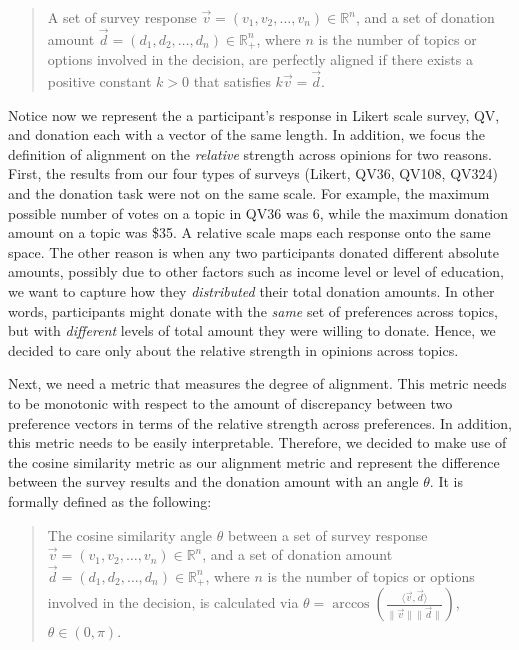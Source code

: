 \begin{quote}
    A set of survey response $\vec{v} = (v_1, v_2, \dots, v_n) \in \mathbb{R}^n$, and a set of donation amount $\vec{d} = (d_1, d_2, \dots, d_n)\in \mathbb{R}_{+}^n$, where $n$ is the number of topics or options involved in the decision, are perfectly aligned if there exists a positive constant $k>0$ that satisfies $k\vec{v} = \vec{d}$.
\end{quote}

Notice now we represent the a participant's response in Likert scale survey, QV, and donation each with a vector of the same length. In addition, we focus the definition of alignment on the \textit{relative} strength across opinions for two reasons. First, the results from our four types of surveys (Likert, QV36, QV108, QV324) and the donation task were not on the same scale. For example, the maximum possible number of votes on a topic in QV36 was 6, while the maximum donation amount on a topic was \$35. A relative scale maps each response onto the same space. The other reason is when any two participants donated different absolute amounts, possibly due to other factors such as income level or level of education, we want to capture how they \textit{distributed} their total donation amounts. In other words, participants might donate with the \textit{same} set of preferences across topics, but with \textit{different} levels of total amount they were willing to donate. Hence, we decided to care only about the relative strength in opinions across topics.

Next, we need a metric that measures the degree of alignment. This metric needs to be monotonic with respect to the amount of discrepancy between two preference vectors in terms of the relative strength across preferences. In addition, this metric needs to be easily interpretable. Therefore, we decided to make use of the cosine similarity metric as our alignment metric and represent the difference between the survey results and the donation amount with an angle $\theta$. It is formally defined as the following:

\begin{quote}
    The cosine similarity angle $\theta$ between a set of survey response $\vec{v} = (v_1, v_2,\dots, v_n) \in \mathbb{R}^n$, and a set of donation amount $\vec{d} = (d_1, d_2,\dots, d_n) \in \mathbb{R}_{+}^n$, where $n$ is the number of topics or options involved in the decision, is calculated via $\theta = \arccos \left ( {\frac{\langle \vec{v},  \vec{d} \rangle}{\|\vec{v}\| \|\vec{d}\|}} \right )$, $\theta \in (0, \pi)$.
\end{quote}

